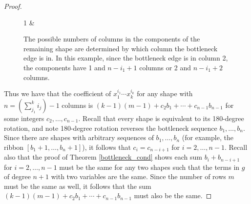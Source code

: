 \documentclass[12pt]{amsart}
\theoremstyle{definition}
\begin{document}
\begin{proof}
\begin{figure}[h!]
\begin{ytableau}
1     & \none
\end{ytableau}
\caption{The possible numbers of columns in the components of the remaining shape are determined by which column the bottleneck edge is in. In this example, since the bottleneck edge is in column 2, the components have 1 and $n-i_1+1$ columns or 2 and $n-i_1+2$ columns.}
\end{figure}
Thus we have that the coefficient of $x_1^{i_1}\cdots x_k^{i_k}$ for any shape with $n = (\sum_{j_1}^k i_j) - 1$ columns is $(k-1)(m-1) + c_2 b_1 + \cdots + c_{n-1} b_{n-1}$ for some integers $c_2,\ldots,c_{n-1}$. Recall that every shape is equivalent to its 180-degree rotation, and note 180-degree rotation reverses the bottleneck sequence $b_1,\ldots,b_n$. Since there are shapes with arbitrary sequences of $b_1,\ldots,b_n$ (for example, the ribbon $[b_1+1,\ldots,b_n+1]$), it follows that $c_i = c_{n-i+1}$ for $i=2,\ldots,n-1$. Recall also that the proof of Theorem \ref{bottleneck_cond} shows each sum $b_i + b_{n-i+1}$ for $i=2,\ldots,n-1$ must be the same for any two shapes such that the terms in $g$ of degree $n+1$ with two variables are the same. Since the number of rows $m$ must be the same as well, it follows that the sum $(k-1)(m-1) + c_2 b_1 + \cdots + c_{n-1} b_{n-1}$ must also be the same.
\end{proof}
\end{document}
